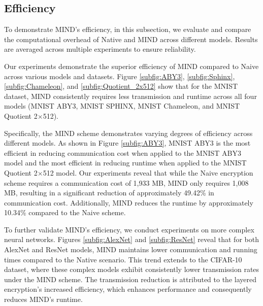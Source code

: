 \documentclass[conference]{IEEEtran}
\begin{document}
\subsection{Efficiency}
To demonstrate MIND's efficiency, in this subsection, we evaluate and compare the computational overhead of Native and MIND across different models. Results are averaged across multiple experiments to ensure reliability.

Our experiments demonstrate the superior efficiency of MIND compared to Naive across various models and datasets. Figure \ref{subfig:ABY3}, \ref{subfig:Sphinx}, \ref{subfig:Chameleon}, and \ref{subfig:Quotient_2x512} show that for the MNIST dataset, MIND consistently requires less transmission and runtime across all four models (MNIST ABY3, MNIST SPHINX, MNIST Chameleon, and MNIST Quotient 2$\times$512).

Specifically, the MIND scheme demonstrates varying degrees of efficiency across different models. As shown in Figure \ref{subfig:ABY3}, MNIST ABY3 is the most efficient in reducing communication cost when applied to the MNIST ABY3 model and the most efficient in reducing runtime when applied to the MNIST Quotient 2$\times$512 model. Our experiments reveal that while the Naive encryption scheme requires a communication cost of 1,933 MB, MIND only requires 1,008 MB, resulting in a significant reduction of approximately 49.42\% in communication cost. Additionally, MIND reduces the runtime by approximately 10.34\% compared to the Naive scheme.

To further validate MIND's efficiency, we conduct experiments on more complex neural networks. Figures \ref{subfig:AlexNet} and \ref{subfig:ResNet} reveal that for both AlexNet and ResNet models, MIND maintains lower communication and running times compared to the Native scenario. This trend extends to the CIFAR-10 dataset, where these complex models exhibit consistently lower transmission rates under the MIND scheme. The transmission reduction is attributed to the layered encryption’s increased efficiency, which enhances performance and consequently reduces MIND's runtime.
\end{document}
